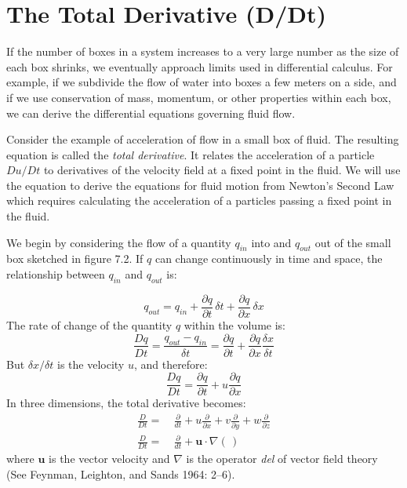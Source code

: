 \section{The Total Derivative (D/Dt)}
If the number of boxes in a system
increases to a very large number as the size of each box shrinks, we
eventually approach limits used in differential calculus. For example,
if we subdivide the flow of water into boxes a few meters on a side,
and if we use conservation of mass, momentum, or other properties
within each box, we can derive the differential equations governing
fluid flow.

Consider the example of acceleration of flow in a small box of
fluid. The resulting equation is called the \textit{total
  derivative}. It relates the acceleration of a particle $Du/Dt$ to
derivatives of the velocity field at a fixed point in the fluid. We
will use the equation to derive the equations for fluid motion from
Newton's Second Law which requires calculating the acceleration of a
particles passing a fixed point in the fluid.

We begin by considering the flow of a quantity $q_{in}$ into and
$q_{out}$ out of the small box sketched in figure 7.2. If $q$ can
change continuously in time and space, the relationship between
$q_{in}$ and $q_{out}$ is:

\begin{equation}
q_{out} = q_{in} + \frac{\partial{q}}{\partial{t}}\,\delta{t} +
\frac{\partial{q}}{\partial{x}}\,\delta{x}
\end{equation}
The rate of change of the quantity $q$ within the volume is:
\begin{equation}
\frac{Dq}{Dt} = \frac{q_{out} - q_{in}}{\delta{t}}=
\frac{\partial{q}}{\partial{t}} +
\frac{\partial{q}}{\partial{x}}\frac{\delta{x}}{\delta{t}}
\end{equation}
But $\delta x /\delta t$ is the velocity $u$, and therefore:
\begin{displaymath}
\frac{Dq}{Dt} = \frac{\partial{q}}{\partial{t}} +
u\frac{\partial{q}}{\partial{x}}
\end{displaymath}
In three dimensions, the total derivative becomes:
\begin{subequations}
\begin{align}
\frac{D}{Dt} = & \:\frac{\partial}{dt} + u\frac{\partial}{\partial{x}} + v\frac{\partial}{\partial y} + w\frac{\partial
}{\partial z}
\\
\frac{D}{Dt} = & \:\frac{\partial}{dt} +
\mathbf{u}\cdot \nabla(\,)
\end{align}
\end{subequations}
where $\mathbf{u}$ is the vector velocity and $\nabla$ is the operator
\textit{del} of vector field theory (See Feynman, Leighton, and Sands
1964: 2--6).

